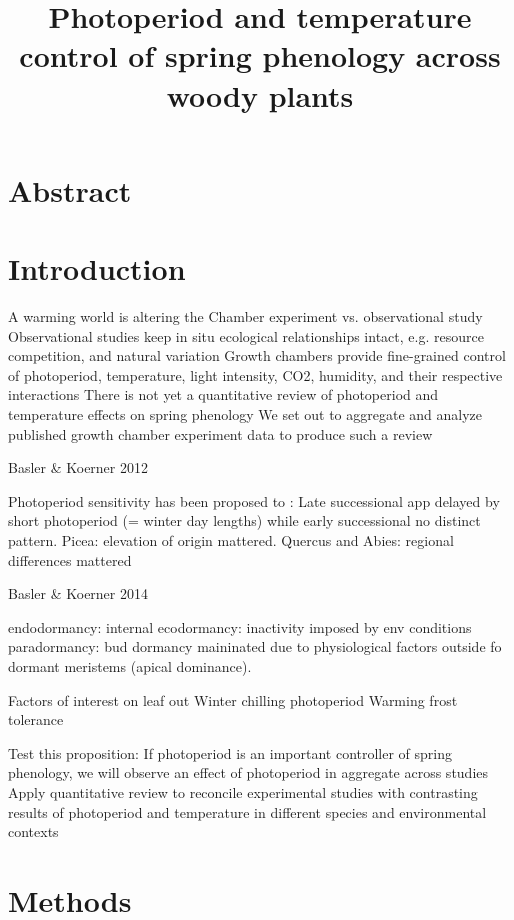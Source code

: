 \documentclass[11pt]{article}
\begin{document}
\title{Photoperiod and temperature control of spring phenology across woody plants}
\maketitle
\section*{Abstract}

\section*{Introduction}

A warming world is altering the 
Chamber experiment vs. observational study
Observational studies keep in situ ecological relationships intact, e.g. resource competition, and natural variation
Growth chambers provide fine-grained control of photoperiod, temperature, light intensity, CO2, humidity, and their respective interactions
There is not yet a quantitative review of photoperiod and temperature effects on spring phenology
We set out to aggregate and analyze published growth chamber experiment data to produce such a review


Basler \& Koerner 2012

Photoperiod sensitivity has been proposed to : Late successional app delayed by short photoperiod (= winter day lengths) while early successional no distinct pattern. 
Picea: elevation of origin mattered. 
Quercus and Abies: regional differences mattered

Basler \& Koerner 2014

endodormancy: internal
ecodormancy: inactivity imposed by env conditions
paradormancy: bud dormancy maininated due to physiological factors outside fo dormant meristems (apical dominance).

Factors of interest on leaf out 
Winter chilling
photoperiod
Warming
frost tolerance 

Test this proposition: If photoperiod is an important controller of spring phenology, we will observe an effect of photoperiod in aggregate across studies
Apply quantitative review to reconcile experimental studies with contrasting results of photoperiod and temperature in different species and environmental contexts

\section*{Methods}
\end{document}
